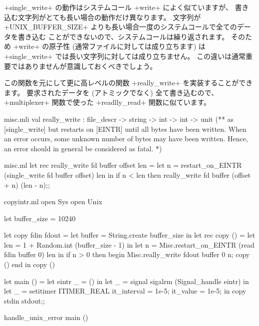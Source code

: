 \ml+single_write+ の動作はシステムコール \ml+write+ によく似ていますが、
書き込む文字列がとても長い場合の動作だけ異なります。
文字列が \ml+UNIX_BUFFER_SIZE+ よりも長い場合一度のシステムコールで全てのデータを書き込む
ことができないので、システムコールは繰り返されます。
そのため \ml+write+ の原子性 (通常ファイルに対しては成り立ちます) は
\ml+single_write+ では長い文字列に対しては成り立ちません。
この違いは通常重要ではありませんが意識しておくべきでしょう。

この関数を元にして更に高レベルの関数 \ml+really_write+ を実装することができます。
要求されたデータを (アトミックでなく) 全て書き込むので、
\ml+multiplexer+ 関数で使った \ml+readlly_read+ 関数に似ています。
%
\begin{codefile}{misc.mli}
val really_write : file_descr -> string -> int -> int -> unit
(** as [single_write] but restarts on [EINTR] until all bytes have been
written. When an error occurs, some unknown number of bytes may have been
written. Hence, an error should in general be considered as fatal. *)
\end{codefile}
%
\begin{listingcodefile}{misc.ml}
let rec really_write fd buffer offset len =
  let n = restart_on_EINTR (single_write fd buffer offset) len in
  if n < len then really_write fd buffer (offset + n) (len - n);;
\end{listingcodefile}
%
\begin{codefile}{copyintr.ml}
open Sys
open Unix

let buffer_size = 10240

let copy fdin fdout =
  let buffer = String.create buffer_size in
  let rec copy ()  =
    let len = 1 + Random.int (buffer_size - 1) in
    let n = Misc.restart_on_EINTR (read fdin buffer 0) len in
    if n > 0 then
      begin
        Misc.really_write fdout buffer 0 n;
        copy ()
      end in
  copy ()

let main () =
  let eintr _ = () in
  let _ = signal sigalrm (Signal_handle eintr) in
  let _ = setitimer ITIMER_REAL { it_interval = 1e-5; it_value = 1e-5; } in
  copy stdin stdout;;

handle_unix_error main ()
\end{codefile}
%
